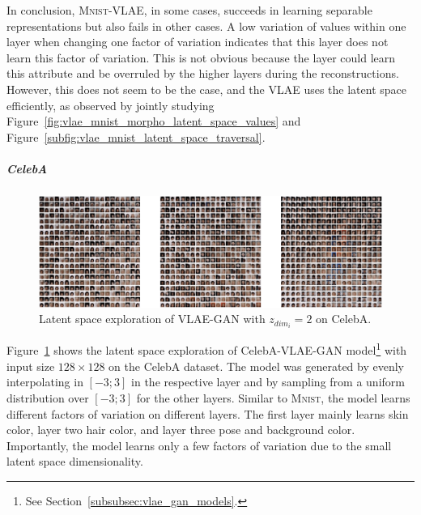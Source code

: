 In conclusion, \textsc{Mnist}-\ac{VLAE}, in some cases, succeeds in learning separable representations but also fails in other cases.
A low variation of values within one layer when changing one factor of variation indicates that this layer does not learn this factor of variation.
This is not obvious because the layer could learn this attribute and be overruled by the higher layers during the reconstructions.
However, this does not seem to be the case, and the \ac{VLAE} uses the latent space efficiently, as observed by jointly studying Figure~\ref{fig:vlae_mnist_morpho_latent_space_values} and Figure~\ref{subfig:vlae_mnist_latent_space_traversal}.

\subparagraph{CelebA}

\begin{figure}
    \centering
    \includegraphics[width=\textwidth]{images/latent_space_traversals/vlae_gan_celeba.png}
    \caption[\ac{VLAE}-\ac{GAN} on CelebA: Latent Space Exploration]{Latent space exploration of \ac{VLAE}-\ac{GAN} with $z_{dim_i}=2$ on CelebA.}
    \label{fig:celeba_latent_space_traversal}
\end{figure}

Figure~\ref{fig:celeba_latent_space_traversal} shows the latent space exploration of CelebA-\ac{VLAE}-\ac{GAN} model\footnote{See Section~\ref{subsubsec:vlae_gan_models}.} with input size $128\times 128$ on the CelebA dataset.
The model was generated by evenly interpolating in $[-3; 3]$ in the respective layer and by sampling from a uniform distribution over $[-3; 3]$ for the other layers.
Similar to \textsc{Mnist}, the model learns different factors of variation on different layers.
The first layer mainly learns skin color, layer two hair color, and layer three pose and background color.
Importantly, the model learns only a few factors of variation due to the small latent space dimensionality.

